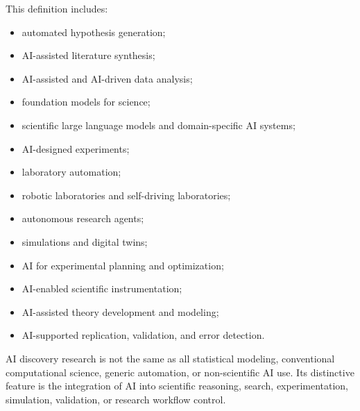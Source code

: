 \documentclass[12pt]{article}
\begin{document}
This definition includes:
\begin{itemize}[leftmargin=*]
    \item automated hypothesis generation;
    \item AI-assisted literature synthesis;
    \item AI-assisted and AI-driven data analysis;
    \item foundation models for science;
    \item scientific large language models and domain-specific AI systems;
    \item AI-designed experiments;
    \item laboratory automation;
    \item robotic laboratories and self-driving laboratories;
    \item autonomous research agents;
    \item simulations and digital twins;
    \item AI for experimental planning and optimization;
    \item AI-enabled scientific instrumentation;
    \item AI-assisted theory development and modeling;
    \item AI-supported replication, validation, and error detection.
\end{itemize}

AI discovery research is not the same as all statistical modeling, conventional computational science, generic automation, or non-scientific AI use. Its distinctive feature is the integration of AI into scientific reasoning, search, experimentation, simulation, validation, or research workflow control.
\end{document}
